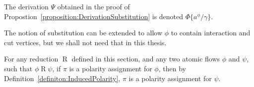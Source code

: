 
\begin{notation}
The derivation $\Psi$ obtained in the proof of Propostion~\vref{proposition:DerivationSubstitution} is denoted $\Phi\{a^\phi/\gamma\}$.
\end{notation}

\begin{remark}
The notion of substitution can be extended to allow $\phi$ to contain interaction and cut vertices, but we shall not need that in this thesis.
\end{remark}



\begin{remark}\label{remark:ReductionPolarity}
For any reduction $\mathrel R$ defined in this section, and any two atomic flows $\phi$ and $\psi$, such that $\phi\mathrel{R}\psi$, if $\pi$ is a polarity assignment for $\phi$, then by Definition~\vref{definiton:InducedPolarity}, $\pi$ is a polarity assignment for $\psi$.
\end{remark}

